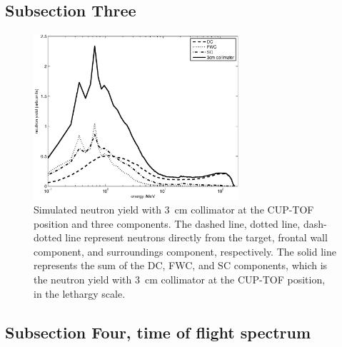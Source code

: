 \documentclass[12pt,journal]{IEEEtran}
\let\MYoriglatexcaption\caption
\renewcommand{\caption}[2][\relax]{\MYoriglatexcaption[#2]{#2}}
\begin{document}
\subsection{Subsection Three}
\begin{figure}[!t] 
	\centering  
	\includegraphics[width=3in]{TOF3Componentslinear.eps}
	\caption{Simulated neutron yield with \SI{3}{\cm} collimator at the CUP-TOF position and three components. The dashed line, dotted line, dash-dotted line represent neutrons directly from the target, frontal wall component, and surroundings component, respectively. The solid line represents the sum of the DC, FWC, and SC components, which is the neutron yield with \SI{3}{\cm} collimator at the CUP-TOF position, in the lethargy scale.}
	\label{fig:TOF3Componentslinear}
\end{figure}

\subsection{Subsection Four, time of flight spectrum}
\end{document}
